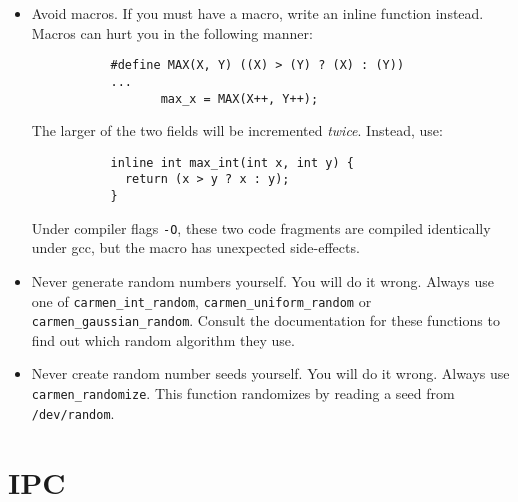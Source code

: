 \documentclass{article}
\begin{document}
\begin{itemize}
\item Avoid macros. If you must have a macro, write an inline function
instead. Macros can hurt you in the following manner:
\begin{verbatim}
           #define MAX(X, Y) ((X) > (Y) ? (X) : (Y))
           ...
                  max_x = MAX(X++, Y++);
\end{verbatim}
The larger of the two fields will be incremented {\em twice}.
Instead, use:
\begin{verbatim}
           inline int max_int(int x, int y) {
             return (x > y ? x : y);
           }
\end{verbatim}
Under compiler flags \verb!-O!, these two code fragments are compiled
identically under gcc, but the macro has unexpected side-effects.

\item Never generate random numbers yourself. You will do it wrong. Always use
one of \verb!carmen_int_random!, \verb!carmen_uniform_random! or
\verb!carmen_gaussian_random!. Consult the documentation for these functions to
find out which random algorithm they use. 

\item Never create random number seeds yourself. You will do it wrong. Always
use \verb!carmen_randomize!. This function randomizes by reading a seed from
\verb!/dev/random!.

\end{itemize}

\section{IPC}
\end{document}
